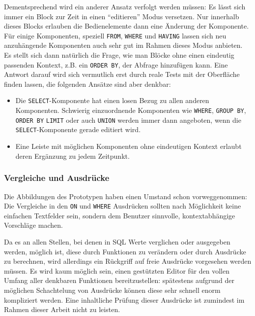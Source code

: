 Dementsprechend wird ein anderer Ansatz verfolgt werden müssen: Es lässt sich immer ein Block zur Zeit in einen ``editieren'' Modus versetzen. Nur innerhalb dieses Blocks erlauben die Bedienelemente dann eine Änderung der Komponente. Für einige Komponenten, speziell \texttt{FROM}, \texttt{WHERE} und \texttt{HAVING} lassen sich neu anzuhängende Komponenten auch sehr gut im Rahmen dieses Modus anbieten. Es stellt sich dann natürlich die Frage, wie man Blöcke ohne einen eindeutig passenden Kontext, z.B. ein \texttt{ORDER BY}, der Abfrage hinzufügen kann. Eine Antwort darauf wird sich vermutlich erst durch reale Tests mit der Oberfläche finden lassen, die folgenden Ansätze sind aber denkbar:

\begin{itemize}
  \item Die \texttt{SELECT}-Komponente hat einen losen Bezug zu allen anderen Komponenten. Schwierig einzuordnende Komponenten wie \texttt{WHERE}, \texttt{GROUP BY}, \texttt{ORDER BY} \texttt{LIMIT} oder auch \texttt{UNION} werden immer dann angeboten, wenn die \texttt{SELECT}-Komponente gerade editiert wird.
  \item Eine Leiste mit möglichen Komponenten ohne eindeutigen Kontext erlaubt deren Ergänzung zu jedem Zeitpunkt.
\end{itemize}


\subsubsection{Vergleiche und Ausdrücke}
\label{sec:sql-compare-and-expression}

Die Abbildungen des Prototypen haben einen Umstand schon vorweggenommen: Die Vergleiche in den \texttt{ON} und \texttt{WHERE} Ausdrücken sollten nach Möglichkeit keine einfachen Textfelder sein, sondern dem Benutzer sinnvolle, kontextabhängige Vorschläge machen.

Da es an allen Stellen, bei denen in SQL Werte verglichen oder ausgegeben werden, möglich ist, diese durch Funktionen zu verändern oder durch Ausdrücke zu berechnen, wird allerdings ein Rückgriff auf freie Ausdrücke vorgesehen werden müssen. Es wird kaum möglich sein, einen gestützten Editor für den vollen Umfang aller denkbaren Funktionen bereitzustellen: spätestens aufgrund der möglichen Schachtelung von Ausdrücke können diese sehr schnell enorm kompliziert werden. Eine inhaltliche Prüfung dieser Ausdrücke ist zumindest im Rahmen dieser Arbeit nicht zu leisten.

